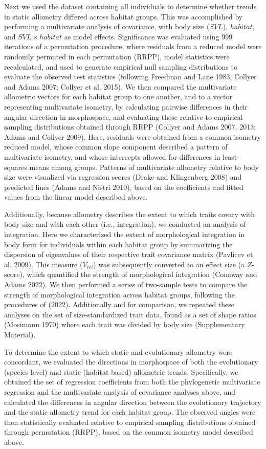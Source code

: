 \documentclass[
  11pt,
]{article}
\begin{document}
Next we used the dataset containing all individuals to determine whether
trends in static allometry differed across habitat groups. This was
accomplished by performing a multivariate analysis of covariance, with
body size (\(SVL\)), \(habitat\), and \(SVL \times habitat\) as model
effects. Significance was evaluated using 999 iterations of a
permutation procedure, where residuals from a reduced model were
randomly permuted in each permutation (RRPP), model statistics were
recalculated, and used to generate empirical null sampling distributions
to evaluate the observed test statistics (following Freedman and Lane
1983; Collyer and Adams 2007; Collyer et al. 2015). We then compared the
multivariate allometric vectors for each habitat group to one another,
and to a vector representing multivariate isometry, by calculating
pairwise differences in their angular direction in morphospace, and
evaluating these relative to empirical sampling distributions obtained
through RRPP (Collyer and Adams 2007, 2013; Adams and Collyer 2009).
Here, residuals were obtained from a common isometry reduced model,
whose common slope component described a pattern of multivariate
isometry, and whose intercepts allowed for differences in least-squares
means among groups. Patterns of multivariate allometry relative to body
size were visualized via regression scores (Drake and Klingenberg 2008)
and predicted lines (Adams and Nistri 2010), based on the coefficients
and fitted values from the linear model described above. \hfill\break

Additionally, because allometry describes the extent to which traits
covary with body size and with each other (i.e., integration), we
conducted an analysis of integration. Here we characterized the extent
of morphological integration in body form for individuals within each
habitat group by summarizing the dispersion of eigenvalues of their
respective trait covariance matrix (Pavlicev et al. 2009). This measure
(\(V_{rel}\)) was subsequently converted to an effect size (a
\(Z\)-score), which quantified the strength of morphological integration
(Conaway and Adams 2022). We then performed a series of two-sample tests
to compare the strength of morphological integration across habitat
groups, following the procedures of (2022). Additionally and for
comparison, we repeated these analyses on the set of size-standardized
trait data, found as a set of shape ratios (Mosimann 1970) where each
trait was divided by body size (Supplementary Material). \hfill\break

To determine the extent to which static and evolutionary allometry were
concordant, we evaluated the directions in morphospace of both the
evolutionary (species-level) and static (habitat-based) allometric
trends. Specifically, we obtained the set of regression coefficients
from both the phylogenetic multivariate regression and the multivariate
analysis of covariance analyses above, and calculated the differences in
angular direction between the evolutionary trajectory and the static
allometry trend for each habitat group. The observed angles were then
statistically evaluated relative to empirical sampling distributions
obtained through permutation (RRPP), based on the common isometry model
described above. \hfill\break
\end{document}
